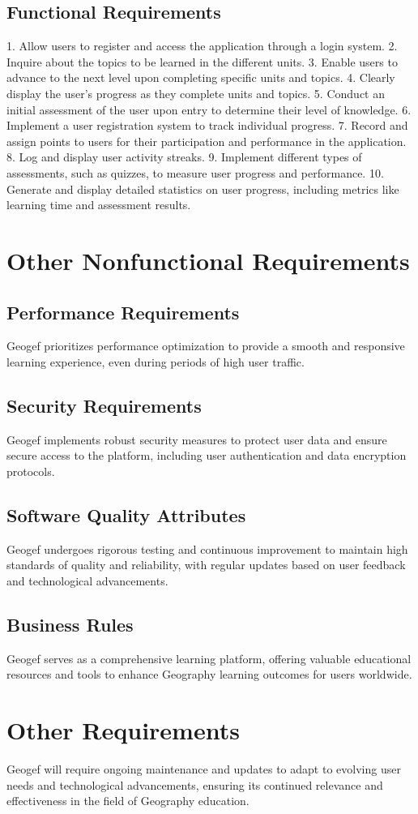\documentclass{scrreprt}
\begin{document}
\section{Functional Requirements}
1. Allow users to register and access the application through a login system.
2. Inquire about the topics to be learned in the different units.
3. Enable users to advance to the next level upon completing specific units and topics.
4. Clearly display the user's progress as they complete units and topics.
5. Conduct an initial assessment of the user upon entry to determine their level of knowledge.
6. Implement a user registration system to track individual progress.
7. Record and assign points to users for their participation and performance in the application.
8. Log and display user activity streaks.
9. Implement different types of assessments, such as quizzes, to measure user progress and performance.
10. Generate and display detailed statistics on user progress, including metrics like learning time and assessment results.

\chapter{Other Nonfunctional Requirements}

\section{Performance Requirements}
Geogef prioritizes performance optimization to provide a smooth and responsive learning experience, even during periods of high user traffic.

\section{Security Requirements}
Geogef implements robust security measures to protect user data and ensure secure access to the platform, including user authentication and data encryption protocols.

\section{Software Quality Attributes}
Geogef undergoes rigorous testing and continuous improvement to maintain high standards of quality and reliability, with regular updates based on user feedback and technological advancements.

\section{Business Rules}
Geogef serves as a comprehensive learning platform, offering valuable educational resources and tools to enhance Geography learning outcomes for users worldwide.

\chapter{Other Requirements}

Geogef will require ongoing maintenance and updates to adapt to evolving user needs and technological advancements, ensuring its continued relevance and effectiveness in the field of Geography education.
\end{document}
